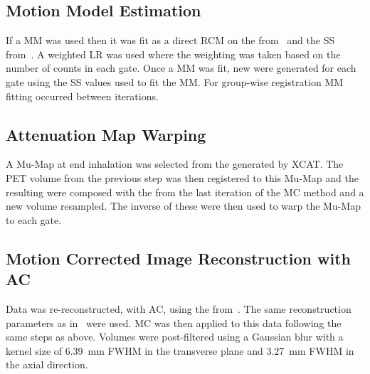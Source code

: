     \vspace{-0.3cm}
    
    \subsection{Motion Model Estimation} \label{sec:motion_model_estimation}
        If a \gls{MM} was used then it was fit as a direct \gls{RCM} on the  from~ and the \gls{SS} from~. A weighted \gls{LR} was used where the weighting was taken based on the number of counts in each gate. Once a \gls{MM} was fit, new  were generated for each gate using the \gls{SS} values used to fit the \gls{MM}. For group-wise registration \gls{MM} fitting occurred between iterations.
    
    \vspace{-0.3cm}
    
    \subsection{Attenuation Map Warping} \label{sec:attenuation_map_warping}
        A \gls{Mu-Map} at end inhalation was selected from the  generated by \gls{XCAT}. The \gls{PET} volume from the previous step was then registered to this \gls{Mu-Map} and the resulting  were composed with the  from the last iteration of the \gls{MC} method and a new volume resampled. The inverse of these  were then used to warp the \gls{Mu-Map} to each gate.
    
    \vspace{-0.3cm}
    
    \subsection{Motion Corrected Image Reconstruction with AC} \label{sec:attenuation_corrected_image_reconstruction}
        Data was re-reconstructed, with \gls{AC}, using the  from~. The same reconstruction parameters as in~ were used. \gls{MC} was then applied to this data following the same steps as above. Volumes were post-filtered using a Gaussian blur with a kernel size of \SI{6.39}{\milli\metre} \gls{FWHM} in the transverse plane and \SI{3.27}{\milli\metre} \gls{FWHM} in the axial direction.
    

